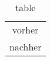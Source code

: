 \begin{table}[htbp]
   \centering
\caption{table}
\begin{tabular}{c}
\hline\hline
vorher \\
nachher \\
\hline\end{tabular}
\label{label}
\end{table}